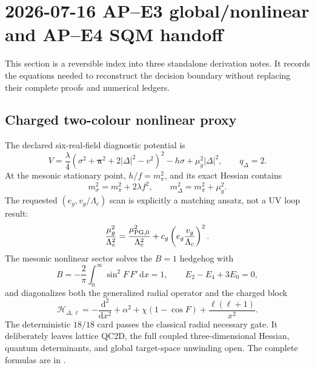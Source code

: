 \documentclass[11pt]{article}
\numberwithin{equation}{section}
\newcommand{\cH}{\mathcal H}
\newcommand{\dd}{\mathrm d}
\begin{document}
\section{2026-07-16 AP--E3 global/nonlinear and AP--E4 SQM handoff}

This section is a reversible index into three standalone derivation notes.
It records the equations needed to reconstruct the decision boundary without
replacing their complete proofs and numerical ledgers.

\subsection{Charged two-colour nonlinear proxy}

The declared six-real-field diagnostic potential is
\begin{equation}
 V=\frac{\lambda}{4}
 \left(\sigma^2+\bm\pi^2+2|\Delta|^2-v^2\right)^2
 -h\sigma+\mu_g^2|\Delta|^2,
 \qquad q_\Delta=2.
 \label{eq:handoff-proxy-potential}
\end{equation}
At the mesonic stationary point, \(h/f=m_\pi^2\), and its exact Hessian
contains
\begin{equation}
 m_\sigma^2=m_\pi^2+2\lambda f^2,\qquad
 m_\Delta^2=m_\pi^2+\mu_g^2.
 \label{eq:handoff-proxy-gaps}
\end{equation}
The requested \((e_g,v_g/\Lambda_c)\) scan is explicitly a matching ansatz,
not a UV loop result:
\begin{equation}
 \frac{\mu_g^2}{\Lambda_c^2}
 =\frac{\mu_{\rm PG,0}^2}{\Lambda_c^2}
 +c_g\left(e_g\frac{v_g}{\Lambda_c}\right)^2.
 \label{eq:handoff-matching-chart}
\end{equation}
The mesonic nonlinear sector solves the \(B=1\) hedgehog with
\begin{equation}
 B=-\frac2\pi\int_0^\infty\sin^2F\,F'\,\dd x=1,
 \qquad E_2-E_4+3E_0=0,
 \label{eq:handoff-b-virial}
\end{equation}
and diagonalizes both the generalized radial operator and the charged block
\begin{equation}
 \cH_{\Delta,\ell}=-\frac{\dd^2}{\dd x^2}+\alpha^2
 +\chi(1-\cos F)+\frac{\ell(\ell+1)}{x^2}.
 \label{eq:handoff-diquark-hessian}
\end{equation}
The deterministic \(18/18\) card passes the classical radial necessary gate.
It deliberately leaves lattice QC2D, the full coupled three-dimensional
Hessian, quantum determinants, and global target-space unwinding open.  The
complete formulas are in
.
\end{document}
